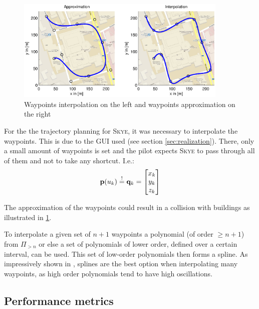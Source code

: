 \begin{figure}[H]
	\centering
    \includegraphics[width = 0.9\textwidth]{graphics/ApproxInterpol.eps}
  \caption{ Waypoints interpolation on the left and waypoints approximation on the right}
  \label{fig:ApproxInterpol}
\end{figure}

For the the trajectory planning for \textsc{Skye}, it was necessary to interpolate the waypoints. This is due to the GUI used (see section \ref{sec:realization}). There, only a small amount of waypoints is set and the pilot expects \textsc{Skye} to pass through all of them and not to take any shortcut. I.e.:
\begin{equation}
{\bf p}(u_k)\stackrel{!}{=}{\bf q}_k=\begin{bmatrix}x_k\\y_k\\z_k \end{bmatrix}
\end{equation}

The approximation of the waypoints could result in a collision with buildings as illustrated in \ref{fig:ApproxInterpol}.


To interpolate a given set of $n+1$ waypoints a polynomial (of order $\ge n+1$) from $\varPi_{>n}$ or else a set of polynomials of lower order, defined over a certain interval, can be used. This set of low-order polynomials then forms a spline. As impressively shown in \cite{dahmen}, splines are the best option when interpolating many waypoints, as high order polynomials tend to have high oscillations.

\subsection{Performance metrics}

